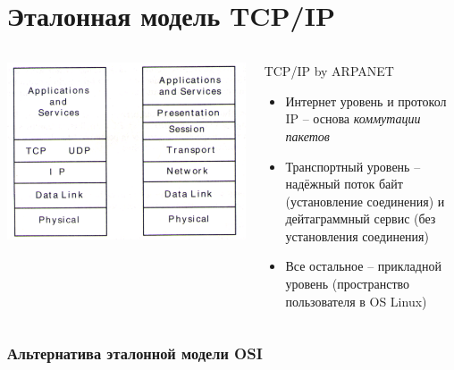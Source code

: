 \documentclass[utf8]{beamer}
\begin{document}
\section{Эталонная модель TCP/IP}
\begin{frame}
\begin{columns}
\begin{block}{}
\centering
\includegraphics[width=1.2\textwidth]{pic/tcpip.pdf}
\end{block}
\begin{block}{TCP/IP by ARPANET}
\begin{itemize}
        \item Интернет уровень и протокол IP -- основа \emph{коммутации пакетов}
        \item Транспортный уровень -- надёжный поток байт (установление соединения) и дейтаграммный сервис (без установления соединения)
        \item Все остальное -- прикладной уровень (пространство пользователя в OS Linux)
\end{itemize}
\end{block}
\end{columns}
\frametitle{Альтернатива эталонной модели OSI}
\end{frame}
\end{document}
